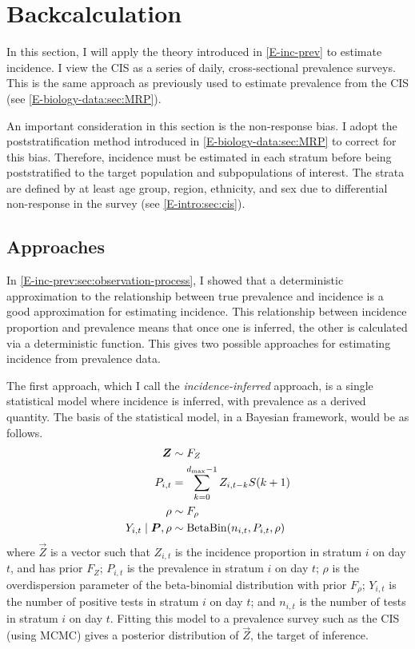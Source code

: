\documentclass[thesis.tex]{subfiles}
\begin{document}
\section{Backcalculation} \label{backcalc}

In this section, I will apply the theory introduced in \cref{E-inc-prev} to estimate incidence.
I view the CIS as a series of daily, cross-sectional prevalence surveys.
This is the same approach as previously used to estimate prevalence from the CIS (see \cref{E-biology-data:sec:MRP}).

An important consideration in this section is the non-response bias.
I adopt the poststratification method introduced in \cref{E-biology-data:sec:MRP} to correct for this bias.
Therefore, incidence must be estimated in each stratum before being poststratified to the target population and subpopulations of interest.
The strata are defined by at least age group, region, ethnicity, and sex due to differential non-response in the survey (see \cref{E-intro:sec:cis}).

\subsection{Approaches} \label{backcalc:sec:approach}

In \cref{E-inc-prev:sec:observation-process}, I showed that a deterministic approximation to the relationship between true prevalence and incidence is a good approximation for estimating incidence.
This relationship between incidence proportion and prevalence means that once one is inferred, the other is calculated via a deterministic function.
This gives two possible approaches for estimating incidence from prevalence data.


The first approach, which I call the \emph{incidence-inferred} approach, is a single statistical model where incidence is inferred, with prevalence as a derived quantity.
The basis of the statistical model, in a Bayesian framework, would be as follows.
\begin{align}
    \bm{Z} &\sim F_Z \\
    P_{i,t}  &= \sum_{k=0}^{d_\text{max}-1} Z_{i,t-k} S(k+1) \\
    \rho &\sim F_\rho \\
    Y_{i,t} \mid \bm{P}, \rho &\sim \operatorname{BetaBin}(n_{i,t}, P_{i,t}, \rho)
\end{align}
where $\vec{Z}$ is a vector such that $Z_{i,t}$ is the incidence proportion in stratum $i$ on day $t$, and has prior $F_Z$; $P_{i,t}$ is the prevalence in stratum $i$ on day $t$; $\rho$ is the overdispersion parameter of the beta-binomial distribution with prior $F_\rho$; $Y_{i,t}$ is the number of positive tests in stratum $i$ on day $t$; and $n_{i,t}$ is the number of tests in stratum $i$ on day $t$.
Fitting this model to a prevalence survey such as the CIS (\eg using MCMC) gives a posterior distribution of $\vec{Z}$, the target of inference.
\end{document}
